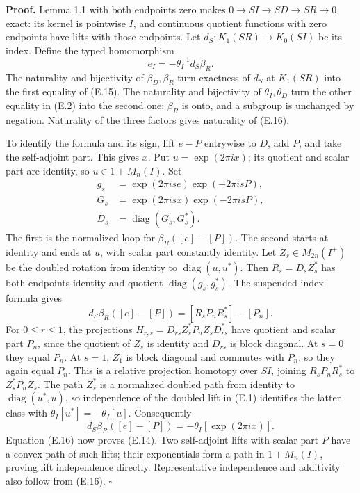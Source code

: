 \documentclass[
  11pt,
]{article}
\begin{document}
\textbf{Proof.} Lemma 1.1 with both endpoints zero makes
\(0\to SI\to SD\to SR\to0\) exact: its kernel is pointwise \(I\), and
continuous quotient functions with zero endpoints have lifts with those
endpoints. Let \(d_S:K_1(SR)\to K_0(SI)\) be its index. Define the typed
homomorphism \[
e_I=-\theta_I^{-1}d_S\beta_R.
\tag{E.16}
\] The naturality and bijectivity of \(\beta_D,\beta_R\) turn exactness
of \(d_S\) at \(K_1(SR)\) into the first equality of (E.15). The
naturality and bijectivity of \(\theta_I,\theta_D\) turn the other
equality in (E.2) into the second one: \(\beta_R\) is onto, and a
subgroup is unchanged by negation. Naturality of the three factors gives
naturality of (E.16).

To identify the formula and its sign, lift \(e-P\) entrywise to \(D\),
add \(P\), and take the self-adjoint part. This gives \(x\). Put
\(u=\exp(2\pi i x)\); its quotient and scalar part are identity, so
\(u\in1+M_n(I)\). Set \[
\begin{aligned}
g_s&=\exp(2\pi i s e)\exp(-2\pi i sP),\\
G_s&=\exp(2\pi i s x)\exp(-2\pi i sP),\\
D_s&=\operatorname{diag}(G_s,G_s^*).
\end{aligned}
\] The first is the normalized loop for \(\beta_R([e]-[P])\). The second
starts at identity and ends at \(u\), with scalar part constantly
identity. Let \(Z_s\in M_{2n}(I^+)\) be the doubled rotation from
identity to \(\operatorname{diag}(u,u^*)\). Then \(R_s=D_sZ_s^*\) has
both endpoints identity and quotient \(\operatorname{diag}(g_s,g_s^*)\).
The suspended index formula gives \[
d_S\beta_R([e]-[P])=[R_sP_nR_s^*]-[P_n].
\] For \(0\leq r\leq1\), the projections
\(H_{r,s}=D_{rs}Z_s^*P_nZ_sD_{rs}^*\) have quotient and scalar part
\(P_n\), since the quotient of \(Z_s\) is identity and \(D_{rs}\) is
block diagonal. At \(s=0\) they equal \(P_n\). At \(s=1\), \(Z_1\) is
block diagonal and commutes with \(P_n\), so they again equal \(P_n\).
This is a relative projection homotopy over \(SI\), joining
\(R_sP_nR_s^*\) to \(Z_s^*P_nZ_s\). The path \(Z_s^*\) is a normalized
doubled path from identity to \(\operatorname{diag}(u^*,u)\), so
independence of the doubled lift in (E.1) identifies the latter class
with \(\theta_I[u^*]=-\theta_I[u]\). Consequently \[
d_S\beta_R([e]-[P])=-\theta_I[\exp(2\pi i x)].
\] Equation (E.16) now proves (E.14). Two self-adjoint lifts with scalar
part \(P\) have a convex path of such lifts; their exponentials form a
path in \(1+M_n(I)\), proving lift independence directly. Representative
independence and additivity also follow from (E.16). \(\square\)
\end{document}
